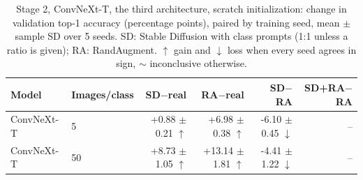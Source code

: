 \begin{table}[H]
\centering
\small
\setlength{\tabcolsep}{4pt}
\caption{Stage 2, ConvNeXt-T, the third architecture, scratch initialization: change in validation top-1 accuracy (percentage points), paired by training seed, mean $\pm$ sample SD over 5 seeds. SD: Stable Diffusion with class prompts (1:1 unless a ratio is given); RA: RandAugment. $\uparrow$ gain and $\downarrow$ loss when every seed agrees in sign, $\sim$ inconclusive otherwise.}
\label{tab:stage2-convnext-scratch}
\begin{tabular}{llrrrr}
\toprule
Model & Images/class & SD$-$real & RA$-$real & SD$-$RA & SD+RA$-$RA \\
\midrule
ConvNeXt-T & 5 & +0.88 $\pm$ 0.21 $\uparrow$ & +6.98 $\pm$ 0.38 $\uparrow$ & -6.10 $\pm$ 0.45 $\downarrow$ & -- \\
ConvNeXt-T & 50 & +8.73 $\pm$ 1.05 $\uparrow$ & +13.14 $\pm$ 1.81 $\uparrow$ & -4.41 $\pm$ 1.22 $\downarrow$ & -- \\
\bottomrule
\end{tabular}
\end{table}
